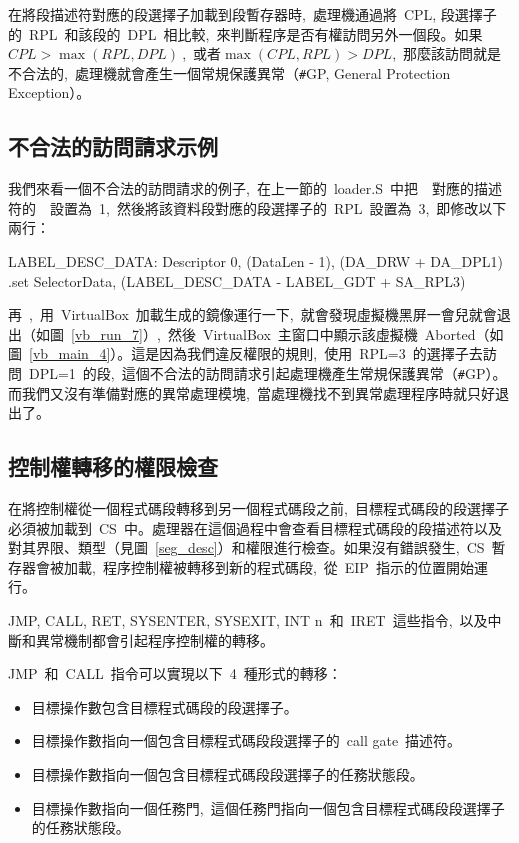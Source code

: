 在將段描述符對應的段選擇子加載到段暫存器時,~處理機通過將~CPL, 段選擇子的~RPL~和該段的~DPL~相比較,~來判斷程序是否有權訪問另外一個段。如果~$CPL>\max{(RPL, DPL)}~$,~或者$\max{(CPL, RPL)}>DPL$,~那麼該訪問就是不合法的,~處理機就會產生一個常規保護異常（\texttt{\#}GP, General Protection Exception）。

\subsection{不合法的訪問請求示例}

我們來看一個不合法的訪問請求的例子,~在上一節的~loader.S~中把~~對應的描述符的~~設置為~1,~然後將該資料段對應的段選擇子的~RPL~設置為~3,~即修改以下兩行：
\begin{Command}
LABEL_DESC_DATA:    Descriptor        0,      (DataLen - 1), (DA_DRW + DA_DPL1)
.set    SelectorData,   (LABEL_DESC_DATA   - LABEL_GDT + SA_RPL3)
\end{Command}



再~,~用~VirtualBox~加載生成的鏡像運行一下,~就會發現虛擬機黑屏一會兒就會退出（如圖~\ref{vb_run_7}）,~然後~VirtualBox~主窗口中顯示該虛擬機~Aborted（如圖~\ref{vb_main_4}）。這是因為我們違反權限的規則,~使用~RPL=3~的選擇子去訪問~DPL=1~的段,~這個不合法的訪問請求引起處理機產生常規保護異常（\texttt{\#}GP）。而我們又沒有準備對應的異常處理模塊,~當處理機找不到異常處理程序時就只好退出了。


\subsection{控制權轉移的權限檢查}

在將控制權從一個程式碼段轉移到另一個程式碼段之前,~目標程式碼段的段選擇子必須被加載到~CS~中。處理器在這個過程中會查看目標程式碼段的段描述符以及對其界限、類型（見圖~\ref{seg_desc}）和權限進行檢查。如果沒有錯誤發生,~CS~暫存器會被加載,~程序控制權被轉移到新的程式碼段,~從~EIP~指示的位置開始運行。

JMP, CALL, RET, SYSENTER, SYSEXIT, INT n~和~IRET~這些指令,~以及中斷和異常機制都會引起程序控制權的轉移。

JMP~和~CALL~指令可以實現以下~4~種形式的轉移：

\begin{itemize}
\item 目標操作數包含目標程式碼段的段選擇子。
\item 目標操作數指向一個包含目標程式碼段段選擇子的~call gate~描述符。
\item 目標操作數指向一個包含目標程式碼段段選擇子的任務狀態段。
\item 目標操作數指向一個任務門,~這個任務門指向一個包含目標程式碼段段選擇子的任務狀態段。
\end{itemize}

